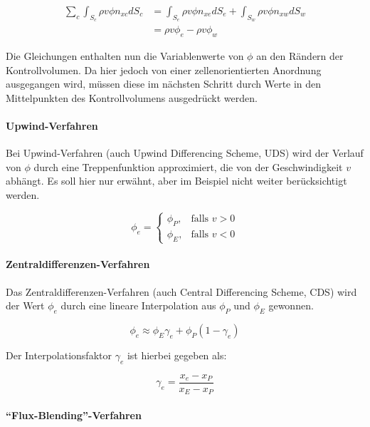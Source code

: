 \documentclass[10pt, ngerman,colorback,accentcolor=tud2d]{tudreport}
\begin{document}
\begin{align}
  \sum_c \int_{S_c} \rho v \phi n_{xc} dS_c &=
  \int_{S_e} \rho v \phi n_{xe} dS_e +\nonumber
  \int_{S_w} \rho v \phi n_{xw} dS_w\\
  &= \rho v \phi_e - \rho v \phi_w \label{eq:surface_east_west}
\end{align}

Die Gleichungen enthalten nun die Variablenwerte von $\phi$ an den Rändern der
Kontrollvolumen. Da hier jedoch von einer zellenorientierten Anordnung ausgegangen
wird, müssen diese im nächsten Schritt durch Werte in den Mittelpunkten des
Kontrollvolumens ausgedrückt werden.

\paragraph{Upwind-Verfahren}
Bei Upwind-Verfahren (auch Upwind Differencing Scheme, UDS) wird der Verlauf von $\phi$ durch eine Treppenfunktion approximiert, die
von der Geschwindigkeit $v$ abhängt. Es soll hier nur erwähnt, aber im Beispiel
nicht weiter berücksichtigt werden.

\begin{equation*}
\phi_e=\left\{\begin{array}{cl} \phi_P, & \mbox{falls }v>0\\
\phi_E, & \mbox{falls } v<0\end{array}\right.
\end{equation*}

\paragraph{Zentraldifferenzen-Verfahren}
Das Zentraldifferenzen-Verfahren (auch Central Differencing Scheme, CDS) wird der
Wert $\phi_e$ durch eine lineare Interpolation aus $\phi_P$ und $\phi_E$ gewonnen.

\begin{equation*}
  \phi_e \approx \phi_E\gamma_e + \phi_P (1-\gamma_e)
\end{equation*}

Der Interpolationsfaktor $\gamma_e$ ist hierbei gegeben als:

\begin{equation}
  \gamma_e = \frac{x_e-x_P}{x_E-x_P}
  \label{eq:cds_faktor}
\end{equation}

\paragraph{``Flux-Blending''-Verfahren}
\end{document}
